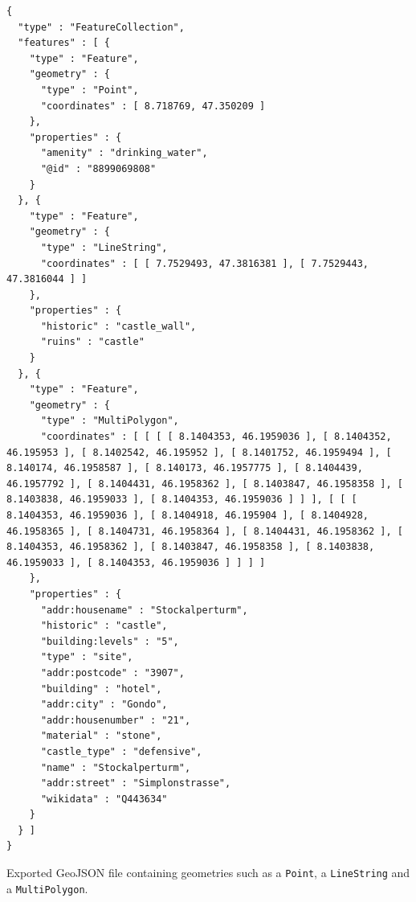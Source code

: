 \begin{verbatim}
{
  "type" : "FeatureCollection",
  "features" : [ {
    "type" : "Feature",
    "geometry" : {
      "type" : "Point",
      "coordinates" : [ 8.718769, 47.350209 ]
    },
    "properties" : {
      "amenity" : "drinking_water",
      "@id" : "8899069808"
    }
  }, {
    "type" : "Feature",
    "geometry" : {
      "type" : "LineString",
      "coordinates" : [ [ 7.7529493, 47.3816381 ], [ 7.7529443, 47.3816044 ] ]
    },
    "properties" : {
      "historic" : "castle_wall",
      "ruins" : "castle"
    }
  }, {
    "type" : "Feature",
    "geometry" : {
      "type" : "MultiPolygon",
      "coordinates" : [ [ [ [ 8.1404353, 46.1959036 ], [ 8.1404352, 46.195953 ], [ 8.1402542, 46.195952 ], [ 8.1401752, 46.1959494 ], [ 8.140174, 46.1958587 ], [ 8.140173, 46.1957775 ], [ 8.1404439, 46.1957792 ], [ 8.1404431, 46.1958362 ], [ 8.1403847, 46.1958358 ], [ 8.1403838, 46.1959033 ], [ 8.1404353, 46.1959036 ] ] ], [ [ [ 8.1404353, 46.1959036 ], [ 8.1404918, 46.195904 ], [ 8.1404928, 46.1958365 ], [ 8.1404731, 46.1958364 ], [ 8.1404431, 46.1958362 ], [ 8.1404353, 46.1958362 ], [ 8.1403847, 46.1958358 ], [ 8.1403838, 46.1959033 ], [ 8.1404353, 46.1959036 ] ] ] ]
    },
    "properties" : {
      "addr:housename" : "Stockalperturm",
      "historic" : "castle",
      "building:levels" : "5",
      "type" : "site",
      "addr:postcode" : "3907",
      "building" : "hotel",
      "addr:city" : "Gondo",
      "addr:housenumber" : "21",
      "material" : "stone",
      "castle_type" : "defensive",
      "name" : "Stockalperturm",
      "addr:street" : "Simplonstrasse",
      "wikidata" : "Q443634"
    }
  } ]
}
\end{verbatim}
Exported GeoJSON file containing geometries such as a \texttt{Point}, a \texttt{LineString}  and a \texttt{MultiPolygon}.
\pagebreak
